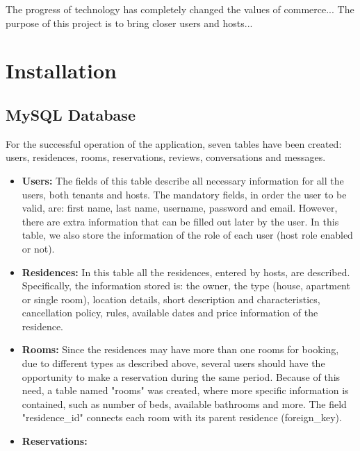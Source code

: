 \documentclass[12pt]{article}
\begin{document}
The progress of technology has completely changed the values of commerce... %
The purpose of this project is to bring closer users and hosts... %


\section{Installation}

\subsection{MySQL Database}
For the successful operation of the application, seven tables have been created: users, residences, rooms, reservations, reviews, conversations and messages. 

\begin{itemize}
	\item \textbf{Users: }The fields of this table describe all necessary information for all the users, both tenants and hosts. The mandatory fields, in order the user to be valid, are: first name, last name, username, password and email. However, there are extra information that can be filled out later by the user. In this table, we also store the information of the role of each user (host role enabled or not).
	\item \textbf{Residences: }In this table all the residences, entered by hosts, are described. Specifically, the information stored is: the owner, the type (house, apartment or single room), location details, short description and characteristics, cancellation policy, rules, available dates and price information of the residence. 
	\item \textbf{Rooms: }Since the residences may have more than one rooms for booking, due to different types as described above, several users should have the opportunity to make a reservation during the same period. Because of this need, a table named "rooms" was created, where more specific information is contained, such as number of beds, available bathrooms and more. The field "residence\_id" connects each room with its parent residence (foreign\_key).
	\item \textbf{Reservations: }
\end{itemize}





\end{document}
